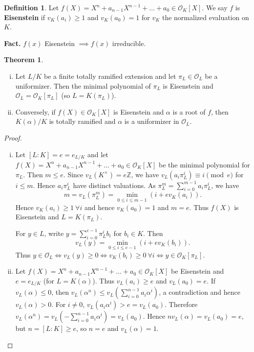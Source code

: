 \documentclass{article}
\theoremstyle{definition}
\newtheorem{theorem}{Theorem}[section]
\newtheorem{defn}{Definition}[section]
\begin{document}
\begin{defn}
    Let $f(X)=X^n + a_{n-1}X^{n-1} + \ldots + a_0 \in \mathcal{O}_K[X]$. We say $f$ is \textbf{Eisenstein} if $v_{K}(a_i)\ge 1$ and $v_K(a_0) = 1$ for $v_K$ the normalized evaluation on $K$.
\end{defn}
\textbf{Fact.} $f(x)$ Eisenstein $\implies f(x)$ irreducible.
\begin{theorem}\label{theorem13.5}
    \begin{enumerate}[(i)]
        \item Let $L/K$ be a finite totally ramified extension and let $\pi_L \in \mathcal{O}_L$ be a uniformizer. Then the minimal polynomial of $\pi_L$ is Eisenstein and $\mathcal{O}_L = \mathcal{O}_K[\pi_L]$ (so $L = K(\pi_L)$).
        \item Conversely, if $f(X) \in \mathcal{O}_K[X]$ is Eisenstein and $\alpha$ is a root of $f$, then $K(\alpha)/K$ is totally ramified and $\alpha$ is a uniformizer in $\mathcal{O}_L$.
    \end{enumerate}
\end{theorem}
\begin{proof}
    \begin{enumerate}[(i)]
        \item Let $[L:K] = e = e_{L/K}$ and let $f(X) = X^n + a_{n-1}X^{n-1} + \ldots + a_0 \in \mathcal{O}_K[X]$ be the minimal polynomial for $\pi_L$. Then $m\le e$. Since $v_L(K^\times) = e \mathbb{Z}$, we have $v_L(a_i \pi_L^i) \equiv  i \pmod{e}$ for $i\le m$. Hence $a_i \pi_L^i$ have distinct valuations. As $\pi_L^m = \sum_{i=0}^{m-1} a_i \pi_L^i$, we have $$m = v_L(\pi_L^m) = \min_{0\le i\le m-1}(i + e v_K(a_i)).$$
        Hence $v_K(a_i)\ge 1 ~\forall i$ and hence $v_K(a_0) = 1$ and $m = e$. Thus $f(X)$ is Eisenstein and $L = K(\pi_L)$.
        \vspace{1mm}
         
        For $y \in L$, write $ y = \sum_{i=0}^{e-1} \pi_L^i b_i$ for $b_i \in K$. Then $$v_L(y) = \min_{0\le i\le e-1}(i + e v_K(b_i)).$$
        Thus $y \in \mathcal{O}_L \iff v_L(y) \ge 0 \iff v_K(b_i)\ge 0~\forall i \iff y \in \mathcal{O}_K[\pi_L]$.
        \item Let $f(X) = X^n + a_{n-1}X^{n-1} + \ldots + a_0 \in \mathcal{O}_K[X]$ be Eisenstein and $e = e_{L/K}$ (for $L = K(\alpha)$). Thus $v_L(a_i)\ge e$ and $v_L(a_0) = e$. If $v_L(\alpha)\le 0$, then $v_L(\alpha^n)\le v_L \left( \sum_{i=0}^{n-1} a_i \alpha^i \right)$, a contradiction and hence $v_L(\alpha)>0$. For $i\neq 0$, $v_L(a_i \alpha^i)>e = v_L(a_0)$. Therefore $v_L(\alpha^n) = v_L\left(-\sum_{i=0}^{n-1} a_i \alpha^i \right) = v_L(a_0)$. Hence $n v_L(\alpha) = v_L(a_0) = e$, but $n = [L:K]\ge e$, so $n=e$ and $v_L(\alpha) = 1$.
    \end{enumerate}
\end{proof}
\end{document}
